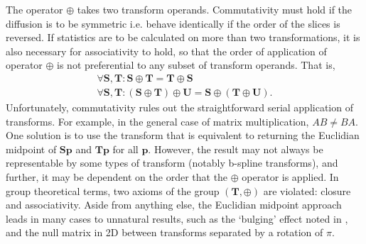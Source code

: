 	  The operator $\oplus$ takes two transform operands. Commutativity must hold if the diffusion is to be symmetric i.e. behave identically if the order of the slices is reversed. If statistics are to be calculated on more than two transformations, it is also necessary for associativity to hold, so that the order of application of operator $\oplus$ is not preferential to any subset of transform operands. That is,
		\begin{gather}
			\forall \mathbf{S}, \mathbf{T} : \mathbf{S} \oplus \mathbf{T} = \mathbf{T} \oplus \mathbf{S} \label{eqn:commutativity} \\
			\forall \mathbf{S}, \mathbf{T} : (\mathbf{S} \oplus \mathbf{T}) \oplus \mathbf{U} = \mathbf{S} \oplus (\mathbf{T} \oplus \mathbf{U}). \label{eqn:associativity}
		\end{gather}
		Unfortunately, commutativity rules out the straightforward serial application of transforms. For example, in the general case of matrix multiplication, $AB \ne BA$. One solution is to use the transform that is equivalent to returning the Euclidian midpoint of $\mathbf{Sp}$ and $\mathbf{Tp}$ for all $\mathbf{p}$. However, the result may not always be representable by some types of transform (notably b-spline transforms), and further, it may be dependent on the order that the $\oplus$ operator is applied. In group theoretical terms, two axioms of the group $(\mathbf{T},\oplus)$ are violated: closure and associativity. Aside from anything else, the Euclidian midpoint approach leads in many cases to unnatural results, such as the `bulging' effect noted in \cite{Arsigny2005a}, and the null matrix in 2D between transforms separated by a rotation of $\pi$.
        
